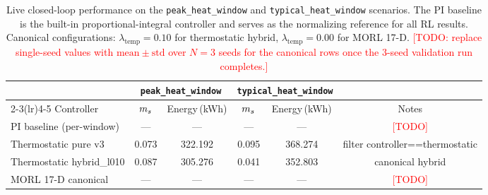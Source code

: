 \begin{table}[t]
  \centering
  \caption{Live \boptest{} closed-loop performance on the \texttt{peak\_heat\_window} and \texttt{typical\_heat\_window} scenarios. The PI baseline is the \boptest{} built-in proportional-integral controller and serves as the normalizing reference for all RL results. Canonical configurations: $\lambda_{\mathrm{temp}}=0.10$ for thermostatic hybrid, $\lambda_{\mathrm{temp}}=0.00$ for MORL 17-D. \textcolor{red}{[TODO: replace single-seed values with $\mathrm{mean}\pm\mathrm{std}$ over $N=3$ seeds for the canonical rows once the 3-seed validation run completes.]}}
  \label{tab:control}
  \begin{tabular}{lccccc}
    \toprule
    & \multicolumn{2}{c}{\texttt{peak\_heat\_window}} & \multicolumn{2}{c}{\texttt{typical\_heat\_window}} & \\
    \cmidrule(lr){2-3}\cmidrule(lr){4-5}
    Controller & $m_s$ & Energy\,(kWh) & $m_s$ & Energy\,(kWh) & Notes \\
    \midrule
    PI baseline (per-window) & --- & --- & --- & --- & \footnotesize \textcolor{red}{[TODO]} \\
    Thermostatic pure v3 & 0.073 & 322.192 & 0.095 & 368.274 & \footnotesize filter controller==thermostatic \\
    Thermostatic hybrid\_l010 & 0.087 & 305.276 & 0.041 & 352.803 & \footnotesize canonical hybrid \\
    MORL 17-D canonical & --- & --- & --- & --- & \footnotesize \textcolor{red}{[TODO]} \\
    \bottomrule
  \end{tabular}
\end{table}
